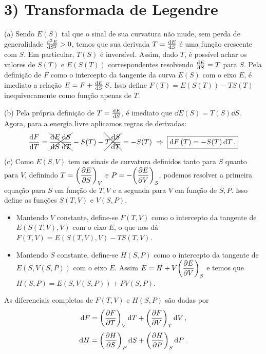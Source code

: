 \documentclass[a4paper,10pt]{article}
\begin{document}
\section*{3) Transformada de Legendre}

(a) Sendo $E(S)$ tal que o sinal de sua curvatura não mude, sem perda de generalidade $\dv[2]{E}{S} > 0$, temos que sua derivada $T = \dv{E}{S}$ é uma função crescente com $S$. Em particular, $T(S)$ é inversível. Assim, dado $T$, é possível achar os valores de $S(T)$ e $E(S(T))$ correspondentes resolvendo $\dv{E}{S} = T$ para $S$. Pela definição de $F$ como o intercepto da tangente da curva $E(S)$ com o eixo $E$, é imediato a relação $E = F + \dv{E}{S} \, S$. Isso define $F(T) = E(S(T)) - T S(T)$ inequivocamente como função apenas de $T$.

\n\n

(b) Pela própria definição de $T = \dv{E}{S}$, é imediato que $\dd{E}(S) = T(S) \dd{S}$. Agora, para a energia livre aplicamos regras de derivadas:
$$
\dv{F}{T} = \xcancel{\dv{E}{S} \dv{S}{T}} - S(T) - \xcancel{T \dv{S}{T}} = -S(T) \; \Rightarrow \; \boxed{\dd{F}(T) = -S(T) \dd{T}.}
$$

\n\n

(c) Como $E(S,V)$ tem os sinais de curvatura definidos tanto para $S$ quanto para $V$, definindo $\displaystyle{ T = \qty(\pdv{E}{S})_V }$ e $\displaystyle{P = - \qty(\pdv{E}{V})_S}$, podemos resolver a primeira equação para $S$ em função de $T, V$ e a segunda para $V$ em função de $S, P$. Isso define as funções $S(T,V)$ e $V(S,P)$.

\begin{itemize}
\item Mantendo $V$ constante, define-se $F(T,V)$ como o intercepto da tangente de $E(S(T,V), V)$ com o eixo $E$, o que nos dá $\boxed{ F(T,V) = E(S(T,V), V) - T S(T,V) }$.

\item Mantendo $S$ constante, define-se $H(S,P)$ como o intercepto da tangente de $E(S, V(S,P))$ com o eixo $E$. Assim $\displaystyle{E = H + V \qty(\pdv{E}{V})_S}$ e temos que $\boxed{ H(S,P) = E(S, V(S,P)) + P V(S,P) }$.
\end{itemize}

\n

As diferenciais completas de $F(T,V)$ e $H(S, P)$ são dadas por
$$
\dd{F} = \qty(\pdv{F}{T})_{V} \dd{T} + \qty(\pdv{F}{V})_{T} \dd{V},
$$
$$
\dd{H} = \qty(\pdv{H}{S})_{P} \dd{S} + \qty(\pdv{H}{P})_{S} \dd{P}.
$$

\n
\end{document}
